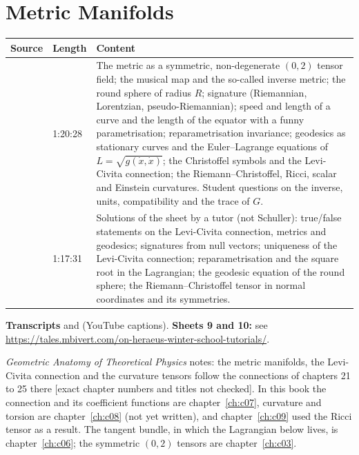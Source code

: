 \chapter{Metric Manifolds}\label{ch:c10}
\begin{paracol}{2}

\begin{sources}
\begin{tabularx}{\linewidth}{@{}l l L@{}}
\toprule
\textbf{Source} & \textbf{Length} & \textbf{Content}\\
\midrule
{} & 1:20:28 & The metric as a symmetric, non-degenerate $(0,2)$ tensor field; the musical map and the so-called inverse metric; the round sphere of radius $R$; signature (Riemannian, Lorentzian, pseudo-Riemannian); speed and length of a curve and the length of the equator with a funny parametrisation; reparametrisation invariance; geodesics as stationary curves and the Euler--Lagrange equations of $L=\sqrt{g(\dot x,\dot x)}$; the Christoffel symbols and the Levi-Civita connection; the Riemann--Christoffel, Ricci, scalar and Einstein curvatures. Student questions on the inverse, units, compatibility and the trace of $G$.\\
 & 1:17:31 & Solutions of the sheet by a tutor (not Schuller): true/false statements on the Levi-Civita connection, metrics and geodesics; signatures from null vectors; uniqueness of the Levi-Civita connection; reparametrisation and the square root in the Lagrangian; the geodesic equation of the round sphere; the Riemann--Christoffel tensor in normal coordinates and its symmetries.\\
\bottomrule
\end{tabularx}

\smallskip
\textbf{Transcripts}  and  (YouTube captions).
\textbf{Sheets 9 and 10:} see \url{https://tales.mbivert.com/on-heraeus-winter-school-tutorials/}.
\end{sources}

\begin{reading}
\emph{Geometric Anatomy of Theoretical Physics} notes: the metric manifolds, the Levi-Civita connection and the curvature tensors follow the connections of chapters 21 to 25 there [exact chapter numbers and titles not checked]. In this book the connection and its coefficient functions are chapter~\ref{ch:c07}, curvature and torsion are chapter~\ref{ch:c08} (not yet written), and chapter~\ref{ch:c09} used the Ricci tensor as a result. The tangent bundle, in which the Lagrangian below lives, is chapter~\ref{ch:c06}; the symmetric $(0,2)$ tensors are chapter~\ref{ch:c03}.
\end{reading}


\end{paracol}
